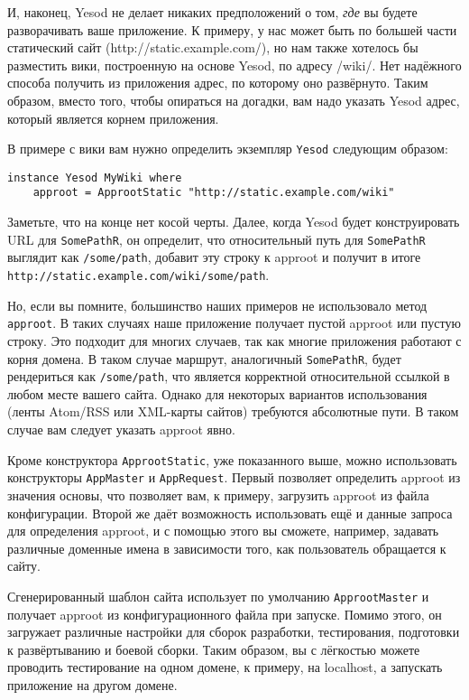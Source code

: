 И, наконец, Yesod не делает никаких предположений о том, \emph{где} вы будете разворачивать ваше приложение. К примеру, у нас может быть по большей части статический сайт (http://static.example.com/), но нам также хотелось бы разместить вики, построенную на основе Yesod, по адресу /wiki/. Нет надёжного способа получить из приложения адрес, по которому оно развёрнуто. Таким образом, вместо того, чтобы опираться на догадки, вам надо указать Yesod адрес, который является корнем приложения.

В примере с вики вам нужно определить экземпляр \lstinline!Yesod! следующим образом:

\begin{lstlisting}
instance Yesod MyWiki where
    approot = ApprootStatic "http://static.example.com/wiki"
\end{lstlisting}

Заметьте, что на конце нет косой черты. Далее, когда Yesod будет конструировать URL для \lstinline!SomePathR!, он определит, что относительный путь для \lstinline!SomePathR! выглядит как \lstinline!/some/path!, добавит эту строку к approot и получит в итоге \lstinline!http://static.example.com/wiki/some/path!.

Но, если вы помните, большинство наших примеров не использовало метод \lstinline!approot!. В таких случаях наше приложение получает пустой approot или пустую строку. Это подходит для многих случаев, так как многие приложения работают с корня домена. В таком случае маршрут, аналогичный \lstinline!SomePathR!, будет рендериться как \lstinline!/some/path!, что является корректной относительной ссылкой в любом месте вашего сайта. Однако для некоторых вариантов использования (ленты Atom/RSS или XML-карты сайтов) требуются абсолютные пути. В таком случае вам следует указать approot явно.

Кроме конструктора \lstinline!ApprootStatic!, уже показанного выше, можно использовать конструкторы \lstinline!AppMaster! и \lstinline!AppRequest!. Первый позволяет определить approot из значения основы, что позволяет вам, к примеру, загрузить approot из файла конфигурации. Второй же даёт возможность использовать ещё и данные запроса для определения approot, и с помощью этого вы сможете, например, задавать различные доменные имена в зависимости того, как пользователь обращается к сайту.

Сгенерированный шаблон сайта использует по умолчанию \lstinline!ApprootMaster! и получает approot из конфигурационного файла при запуске. Помимо этого, он загружает различные настройки для сборок разработки, тестирования, подготовки к развёртыванию и боевой сборки. Таким образом, вы с лёгкостью можете проводить тестирование на одном домене, к примеру, на localhost, а запускать приложение на другом домене.

